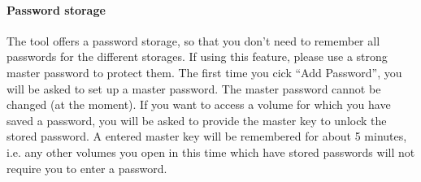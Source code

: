 \documentclass[a4paper,10pt]{report}
\begin{document}
\paragraph{Password storage}
The tool offers a password storage, so that you don't need to remember all passwords for the different storages. If using this feature, please use a strong master password to protect them.
The first time you cick ``Add Password'', you will be asked to set up a master password. The master password cannot be changed (at the moment). 
If you want to access a volume for which you have saved a password, you will be asked to provide the master key to unlock the stored password. 
A entered master key will be remembered for about 5 minutes, i.e. any other volumes you open in this time which have stored passwords will not require you to enter a password.
\end{document}
